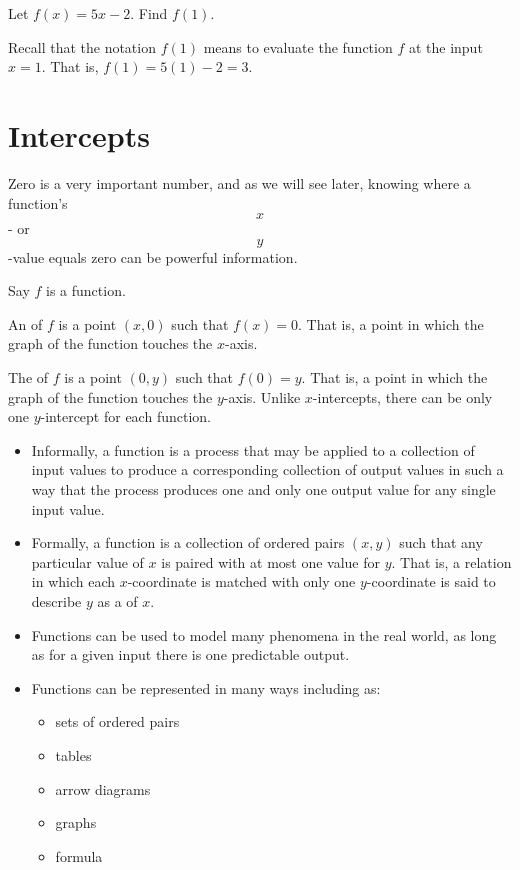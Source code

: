 \documentclass{ximera}
\begin{document}
\begin{example}
Let $f(x)=5x-2$.  Find $f(1)$.

\begin{explanation}
Recall that the notation $f(1)$ means to evaluate the function $f$ at the input $x=1$.  That is, $f(1)=5(1)-2=3$.
\end{explanation}
\end{example}

\section{Intercepts}
Zero is a very important number, and as we will see later, knowing where a function's $$x$$- or $$y$$-value equals zero can be powerful information. 

\begin{definition}[Intercepts]
Say $f$ is a function. 

An  of $f$ is a point $(x,0)$ such that $f(x) = 0$. That is, a point in which the graph of the function touches the $x$-axis. 

The  of $f$ is a point $(0,y)$ such that $f(0) = y$. That is, a point in which the graph of the function touches the $y$-axis. Unlike $x$-intercepts, there can be only one $y$-intercept for each function.
\end{definition}




\begin{summary}\begin{itemize}
\item Informally, a function is a process that may be applied to a collection of input values to produce a corresponding collection of output values in such a way that the process produces one and only one output value for any single input value.
\item Formally, a function  is a collection of ordered pairs $(x,y)$ such that any particular value of $x$ is paired with at most one value for $y$. That is, a relation in which each $x$-coordinate is matched with only one $y$-coordinate is said to describe $y$ as a  of $x$.
\item Functions can be used to model many phenomena in the real world, as long as for a given input there is one predictable output.
\item Functions can be represented in many ways including as:
\begin{itemize}
\item sets of ordered pairs
\item tables
\item arrow diagrams
\item graphs
\item formula
\end{itemize}
\end{itemize}\end{summary}
\end{document}
